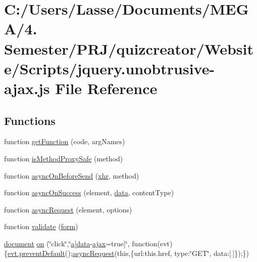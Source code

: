 \hypertarget{jquery_8unobtrusive-ajax_8js}{}\section{C\+:/\+Users/\+Lasse/\+Documents/\+M\+E\+G\+A/4. Semester/\+P\+R\+J/quizcreator/\+Website/\+Scripts/jquery.unobtrusive-\/ajax.js File Reference}
\label{jquery_8unobtrusive-ajax_8js}
\subsection*{Functions}
\begin{DoxyCompactItemize}
\item 
function \hyperlink{jquery_8unobtrusive-ajax_8js_a9c333dd3d8164cd24b4edbdd6576b806}{get\+Function} (code, arg\+Names)
\item 
function \hyperlink{jquery_8unobtrusive-ajax_8js_ad0410b7b7ae61020ff51f7020ce1ce72}{is\+Method\+Proxy\+Safe} (method)
\item 
function \hyperlink{jquery_8unobtrusive-ajax_8js_aa22cb291924253c2dbf908a3dc122653}{async\+On\+Before\+Send} (\hyperlink{_scripts_2jquery-1_810_82_8js_a0b7a5cb538ca9913b1b3b1c807ad06f0}{xhr}, method)
\item 
function \hyperlink{jquery_8unobtrusive-ajax_8js_a236640e7112fe405e13b25712bb846a9}{async\+On\+Success} (element, \hyperlink{jquery_8unobtrusive-ajax_8min_8js_a8f172ae31c11770303ca0c4cb48ceb3a}{data}, content\+Type)
\item 
function \hyperlink{jquery_8unobtrusive-ajax_8js_a82924e12632a0ef54c587ad18b96be1a}{async\+Request} (element, options)
\item 
function \hyperlink{jquery_8unobtrusive-ajax_8js_adf8db01fbef50de60d1968bb75c8181c}{validate} (\hyperlink{login_8js_acfb5ebf8920e47b6c6d297e6ca2a6ce0}{form})
\item 
\hyperlink{_facebook_8js_aa14f8e0338cced6720590fd2ea13bd4b}{document} \hyperlink{jquery_8unobtrusive-ajax_8js_a84fbab1d4fe452dbe44c7b5a4cdcd968}{on} (\char`\"{}click\char`\"{},\char`\"{}\hyperlink{jquery_8unobtrusive-ajax_8min_8js_a9cf3d65797f4cbe9deaab01492290370}{a}\mbox{[}\hyperlink{jquery_8unobtrusive-ajax_8min_8js_a8f172ae31c11770303ca0c4cb48ceb3a}{data}-\/\hyperlink{_scripts_2jquery_8validate_8js_a77004c0fdc08a5bc07afa0b099cdf6df}{ajax}=true\mbox{]}\char`\"{}, function(evt)\{\hyperlink{jquery_8unobtrusive-ajax_8min_8js_a03e5bb88845031b7f017b0a5f0921d5b}{evt.\+prevent\+Default}();\hyperlink{jquery_8unobtrusive-ajax_8js_a82924e12632a0ef54c587ad18b96be1a}{async\+Request}(this,\{url\+:this.\+href, type\+:\char`\"{}G\+E\+T\char`\"{}, data\+:\mbox{[}$\,$\mbox{]}\});\})

\end{DoxyCompactItemize}
